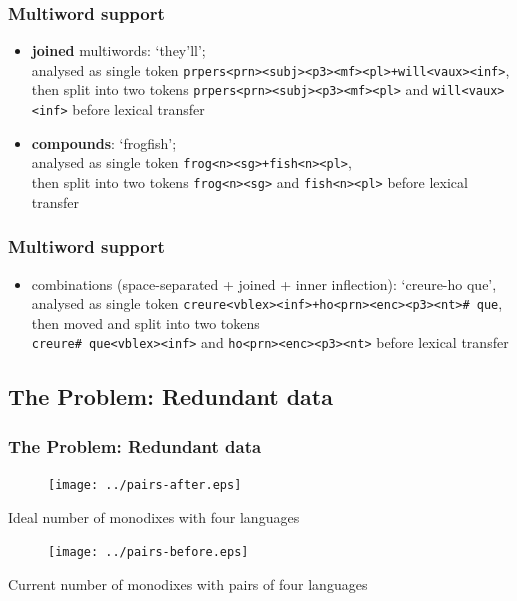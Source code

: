 \documentclass[notes=hide]{beamer}
\newcommand{\ana}[1]{\texttt{#1}}
\newcommand{\form}[1]{`#1'}
\begin{document}
\begin{frame}
  \frametitle{Multiword support}

  \begin{itemize}
  \item \textbf{joined} multiwords: \form{they'll}; \\
    analysed as single token \ana{prpers<prn><subj><p3><mf><pl>+will<vaux><inf>}, \\
    then split into two tokens \ana{prpers<prn><subj><p3><mf><pl>} and
    \ana{will<vaux><inf>} before lexical transfer
  \item \textbf{compounds}: \form{frogfish}; \\
    analysed as single token \ana{frog<n><sg>+fish<n><pl>}, \\
    then split into two tokens \ana{frog<n><sg>} and \ana{fish<n><pl>}
    before lexical transfer
  \end{itemize}
\end{frame}

\begin{frame}
  \frametitle{Multiword support}
  \begin{itemize}
  \item combinations (space-separated + joined + inner inflection):
    \form{creure-ho que},\\
    analysed as single token \ana{creure<vblex><inf>+ho<prn><enc><p3><nt>\# que}, \\
    then moved and split into two tokens \\
    \ana{creure\# que<vblex><inf>} and \ana{ho<prn><enc><p3><nt>}
    before lexical transfer
  \end{itemize}
\end{frame}

\subsection{The Problem: Redundant data}
\begin{frame}
  \frametitle{The Problem: Redundant data}

  \begin{center}
    \begin{figure}[h]
      \texttt{[image: ../pairs-after.eps]}
    \end{figure}
    \small{Ideal number of monodixes with four languages}

    \begin{figure}[h]
      \texttt{[image: ../pairs-before.eps]}
    \end{figure}
    \small{Current number of monodixes with pairs of four languages}
  \end{center}

\end{frame}
\end{document}
